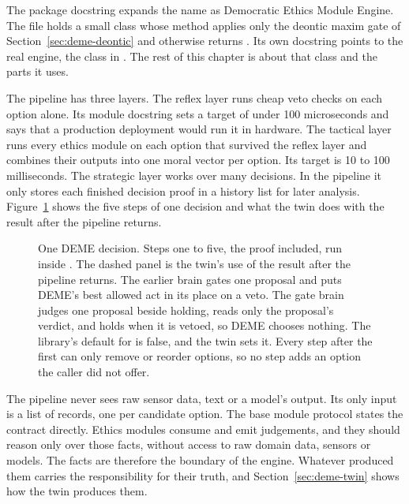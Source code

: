 The package docstring expands the name as Democratic Ethics Module Engine. The file
 holds a small class  whose  method applies only the
deontic maxim gate of Section~\ref{sec:deme-deontic} and otherwise returns . Its own
docstring points to the real engine, the class  in
. The rest of this chapter is about that class and the parts it
uses.

The pipeline has three layers. The reflex layer runs cheap veto checks on each option alone. Its
module docstring sets a target of under 100 microseconds and says that a production deployment
would run it in hardware. The tactical layer runs every ethics module on each option that
survived the reflex layer and combines their outputs into one moral vector per option. Its
target is 10 to 100 milliseconds. The strategic layer works over many decisions. In the pipeline
it only stores each finished decision proof in a history list for later analysis.
Figure~\ref{fig:deme-pipeline} shows the five steps of one decision and what the twin does with
the result after the pipeline returns.

\begin{figure}[t]
\centering

\caption{One DEME decision. Steps one to five, the proof included, run inside
. The dashed panel is the twin's use of the result after the pipeline
returns. The earlier brain gates one proposal and puts DEME's best allowed act in its place on a
veto. The gate brain judges one proposal beside holding, reads only the proposal's verdict, and
holds when it is vetoed, so DEME chooses nothing. The library's
default for  is false, and the twin sets it. Every step after the first can only
remove or reorder options, so no step adds an option the caller did not offer.}
\label{fig:deme-pipeline}
\end{figure}

The pipeline never sees raw sensor data, text or a model's output. Its only input is a list of
 records, one per candidate option. The base module protocol states the
contract directly. Ethics modules consume  and emit judgements, and they
should reason only over those facts, without access to raw domain data, sensors or models. The
facts are therefore the boundary of the engine. Whatever produced them carries the
responsibility for their truth, and Section~\ref{sec:deme-twin} shows how the twin produces
them.

